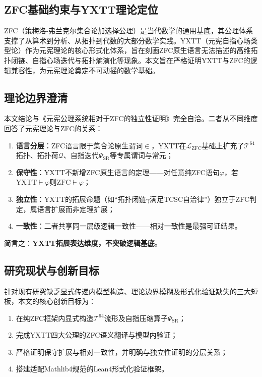 \documentclass[12pt,a4paper]{article}
\theoremstyle{plain}
\theoremstyle{definition}
\newcommand{\Tsixtyfour}{\mathcal{T}^{64}}
\newcommand{\Qcal}{\mathcal{Q}}
\newcommand{\PSR}{\Psi_{\mathrm{SR}}}
\newcommand{\YXTT}{\mathrm{YXTT}}
\newcommand{\ZFC}{\mathrm{ZFC}}
\begin{document}
\subsection{ZFC基础约束与YXTT理论定位}
ZFC（策梅洛-弗兰克尔集合论加选择公理）是当代数学的通用基底，其公理体系支撑了从算术到分析、从拓扑到代数的大部分数学实践。YXTT（元宪自指心场类型论）作为元宪理论的核心形式化体系，旨在刻画ZFC原生语言无法描述的高维拓扑闭链、自指心场迭代与拓扑熵演化等现象\cite{yxt2026axioms}。本文旨在严格证明YXTT与ZFC的逻辑兼容性，为元宪理论奠定不可动摇的数学基础。
 
\subsection{理论边界澄清}
本文结论与《元宪公理系统相对于ZFC的独立性证明》\cite{yxt2026independence}完全自洽。二者从不同维度回答了元宪理论与ZFC的关系：
\begin{enumerate}
   \item \textbf{语言分层}：ZFC语言限于集合论原生谓词$\in$，YXTT在$\mathcal{L}_{\ZFC}$基础上扩充了$\Tsixtyfour$拓扑、拓扑荷$\Qcal$、自指迭代$\PSR$等专属谓词与常元；
   \item \textbf{保守性}：YXTT不新增ZFC原生语言的定理——对任意纯ZFC语句$\varphi$，若$\YXTT\vdash\varphi$则$\ZFC\vdash\varphi$；
   \item \textbf{独立性}：YXTT的拓展命题（如“拓扑闭链$\gamma$满足TCSC自洽律”）独立于ZFC判定，属语言扩展而非定理扩展；
   \item \textbf{一致性}：二者共享同一层级逻辑一致性——相对一致性是最强可证结果。
\end{enumerate}
简言之：\textbf{YXTT拓展表达维度，不突破逻辑基底}。
 
\subsection{研究现状与创新目标}
针对现有研究缺乏显式传递内模型构造、理论边界模糊及形式化验证缺失的三大短板，本文的核心创新目标为：
\begin{enumerate}
   \item 在纯ZFC框架内显式构造$\Tsixtyfour$流形及自指压缩算子$\PSR$；
   \item 完成YXTT四大公理的ZFC语义翻译与模型内验证；
   \item 严格证明保守扩展与相对一致性，并明确与独立性证明的分层关系；
   \item 搭建适配Mathlib4规范的Lean4形式化验证框架。
\end{enumerate}
 
\end{document}
